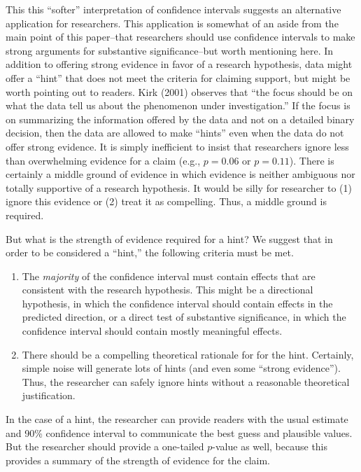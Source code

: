 \documentclass[12pt]{article}
\begin{document}
This this ``softer'' interpretation of confidence intervals suggests an alternative application for researchers. This application is somewhat of an aside from the main point of this paper--that researchers should use confidence intervals to make strong arguments for substantive significance--but worth mentioning here. In addition to offering strong evidence in favor of a research hypothesis, data might offer a ``hint'' that does not meet the criteria for claiming support, but might be worth pointing out to readers. Kirk (2001) observes that ``the focus should be on what the data tell us about the phenomenon under investigation.'' If the focus is on summarizing the information offered by the data and not on a detailed binary decision, then the data are allowed to make ``hints'' even when the data do not offer strong evidence. It is simply inefficient to insist that researchers ignore less than overwhelming evidence for a claim (e.g., $p = 0.06$ or $p = 0.11$). There is certainly a middle ground of evidence in which evidence is neither ambiguous nor totally supportive of a research hypothesis. It would be silly for researcher to (1) ignore this evidence or (2) treat it as compelling. Thus, a middle ground is required. 

But what is the strength of evidence required for a hint? We suggest that in order to be considered a ``hint,'' the following criteria must be met.

\begin{enumerate}
\item The \textit{majority} of the confidence interval must contain effects that are consistent with the research hypothesis. This might be a directional hypothesis, in which the confidence interval should contain effects in the predicted direction, or a direct test of substantive significance, in which the confidence interval should contain mostly meaningful effects.
\item There should be a compelling theoretical rationale for for the hint. Certainly, simple noise will generate lots of hints (and even some ``strong evidence''). Thus, the researcher can safely ignore hints without a reasonable theoretical justification. 
\end{enumerate}

In the case of a hint, the researcher can provide readers with the usual estimate and 90\% confidence interval to communicate the best guess and plausible values. But the researcher should provide a one-tailed $p$-value as well, because this provides a summary of the strength of evidence for the claim.
\end{document}
